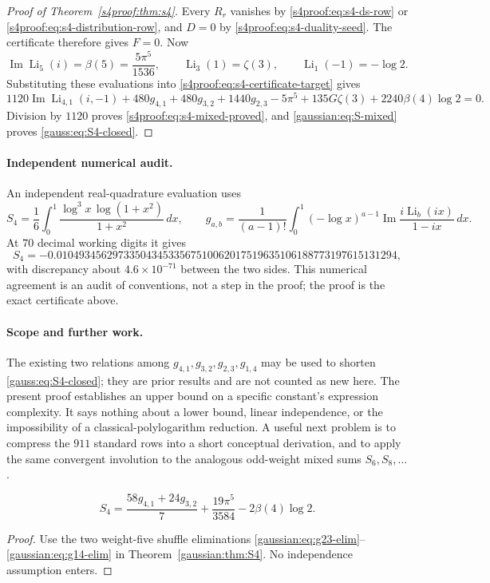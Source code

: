 \begin{proof}[Proof of Theorem~\ref{s4proof:thm:s4}]
Every $R_r$ vanishes by \eqref{s4proof:eq:s4-ds-row} or
\eqref{s4proof:eq:s4-distribution-row}, and $D=0$ by
\eqref{s4proof:eq:s4-duality-seed}. The certificate therefore gives $F=0$.
Now
\[
 \operatorname{Im}\operatorname{Li}_5(i)=\beta(5)=\frac{5\pi^5}{1536},
 \qquad \operatorname{Li}_3(1)=\zeta(3),
 \qquad \operatorname{Li}_1(-1)=-\log2.
\]
Substituting these evaluations into \eqref{s4proof:eq:s4-certificate-target} gives
\[
 1120\operatorname{Im}\operatorname{Li}_{4,1}(i,-1)
 +480g_{4,1}+480g_{3,2}+1440g_{2,3}
 -5\pi^5+135G\zeta(3)+2240\beta(4)\log2=0.
\]
Division by $1120$ proves \eqref{s4proof:eq:s4-mixed-proved}, and
\eqref{gaussian:eq:S-mixed} proves \eqref{gauss:eq:S4-closed}.
\end{proof}

\paragraph{Independent numerical audit.}
An independent real-quadrature evaluation uses
\[
 S_4=\frac16\int_0^1\frac{\log^3x\,\log(1+x^2)}{1+x^2}\,dx,
 \qquad
 g_{a,b}=\frac1{(a-1)!}\int_0^1(-\log x)^{a-1}
 \operatorname{Im}\frac{i\operatorname{Li}_b(ix)}{1-ix}\,dx.
\]
At $70$ decimal working digits it gives
\[
 S_4=-0.0104934562973350434533567510062017519635106188773197615131294,
\]
with discrepancy about $4.6\times10^{-71}$ between the two sides.
This numerical agreement is an audit of conventions, not a step in the
proof; the proof is the exact certificate above.

\paragraph{Scope and further work.}
The existing two relations among $g_{4,1},g_{3,2},g_{2,3},g_{1,4}$ may be
used to shorten \eqref{gauss:eq:S4-closed}; they are prior results and are not
counted as new here. The present proof establishes an upper bound on a
specific constant's expression complexity. It says nothing about a lower
bound, linear independence, or the impossibility of a classical-polylogarithm
reduction. A useful next problem is to compress the $911$ standard rows
into a short conceptual derivation, and to apply the same convergent
involution to the analogous odd-weight mixed sums $S_6,S_8,\ldots$.

\begin{corollary}\label{s4proof:cor:short}
\begin{equation}\label{gaussian:eq:S4-short}
 S_4=\frac{58g_{4,1}+24g_{3,2}}7+\frac{19\pi^5}{3584}-2\beta(4)\log2.
\end{equation}
\end{corollary}
\begin{proof}
Use the two weight-five shuffle eliminations
\eqref{gaussian:eq:g23-elim}--\eqref{gaussian:eq:g14-elim} in
Theorem~\ref{gaussian:thm:S4}. No independence assumption enters.
\end{proof}


